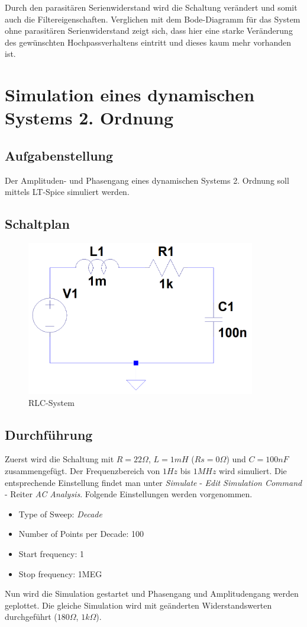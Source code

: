 \documentclass[12pt,a4paper,titlepage]{article}
\begin{document}
\noindent Durch den parasitären Serienwiderstand wird die Schaltung verändert und somit auch die Filtereigenschaften. Verglichen mit dem Bode-Diagramm für das System ohne parasitären Serienwiderstand zeigt sich, dass hier eine starke Veränderung des gewünschten Hochpassverhaltens eintritt und dieses kaum mehr vorhanden ist.


\newpage
\section{Simulation eines dynamischen Systems 2. Ordnung}
\subsection{Aufgabenstellung}
Der Amplituden- und Phasengang eines dynamischen Systems 2. Ordnung soll mittels LT-Spice simuliert werden.

\subsection{Schaltplan}
\begin{figure}[H]
  \centering
  \includegraphics[width=100mm]{filter03_schaltung.PNG}
  \caption{RLC-System}
\end{figure}

\subsection{Durchf\"uhrung}
Zuerst wird die Schaltung mit $R = 22 \Omega$, $L = 1 mH$ ($Rs = 0 \Omega$) und $C = 100 nF$ zusammengef\"ugt. Der Frequenzbereich von $1 Hz$ bis $1 MHz$ wird simuliert. Die entsprechende Einstellung findet man unter \textit{Simulate} - \textit{Edit Simulation Command} - Reiter \textit{AC Analysis}. Folgende Einstellungen werden vorgenommen.
\begin{itemize}
  \item Type of Sweep: \textit{Decade}
  \item Number of Points per Decade: 100
  \item Start frequency: 1
  \item Stop frequency: 1MEG
\end{itemize}
\noindent Nun wird die Simulation gestartet und Phasengang und Amplitudengang werden geplottet. Die gleiche Simulation wird mit ge\"anderten Widerstandswerten durchgef\"uhrt ($180 \Omega$, $1 k\Omega$).
\end{document}
